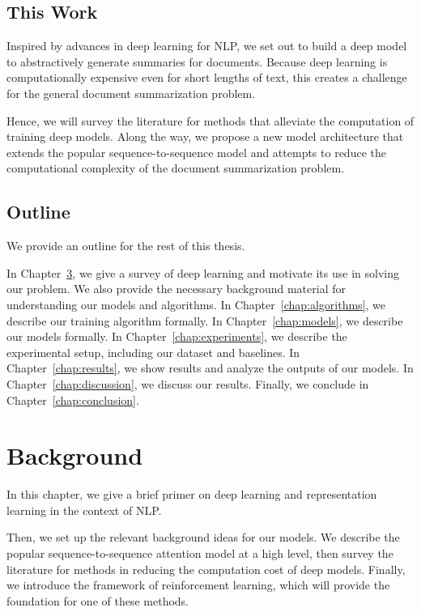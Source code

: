 \documentclass[12pt]{report}
\begin{document}
\section{This Work}

Inspired by advances in deep learning for NLP, we set out to build a deep model to abstractively generate summaries for documents. Because deep learning is computationally expensive even for short lengths of text, this creates a challenge for the general document summarization problem.

Hence, we will survey the literature for methods that alleviate the computation of training deep models. Along the way, we propose a new model architecture that extends the popular sequence-to-sequence model and attempts to reduce the computational complexity of the document summarization problem.

\section{Outline}


We provide an outline for the rest of this thesis.

In Chapter~\ref{chap:background}, we give a survey of deep learning and motivate its use in solving our problem. We also provide the necessary background material for understanding our models and algorithms.
In Chapter~\ref{chap:algorithms}, we describe our training algorithm formally.
In Chapter~\ref{chap:models}, we describe our models formally.
In Chapter~\ref{chap:experiments}, we describe the experimental setup, including our dataset and baselines. %
In Chapter~\ref{chap:results}, we show results and analyze the outputs of our models.
In Chapter~\ref{chap:discussion}, we discuss our results.
Finally, we conclude in Chapter~\ref{chap:conclusion}.


\chapter{Background}
\label{chap:background}

In this chapter, we give a brief primer on deep learning and representation learning in the context of NLP.

Then, we set up the relevant background ideas for our models. We describe the popular sequence-to-sequence attention model at a high level, then survey the literature for methods in reducing the computation cost of deep models. Finally, we introduce the framework of reinforcement learning, which will provide the foundation for one of these methods.
\end{document}
